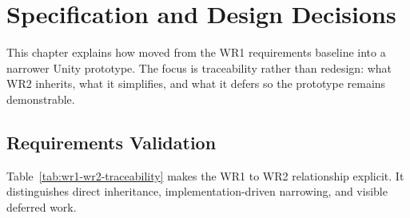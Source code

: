 \chapter{Specification and Design Decisions}

This chapter explains how \projectname{} moved from the WR1 requirements baseline into a narrower Unity prototype. The focus is traceability rather than redesign: what WR2 inherits, what it simplifies, and what it defers so the prototype remains demonstrable.

\section{Requirements Validation}

Table~\ref{tab:wr1-wr2-traceability} makes the WR1 to WR2 relationship explicit. It distinguishes direct inheritance, implementation-driven narrowing, and visible deferred work.

\providecommand{\tracecell}[2]{\parbox[t]{#1}{\RaggedRight #2}}

